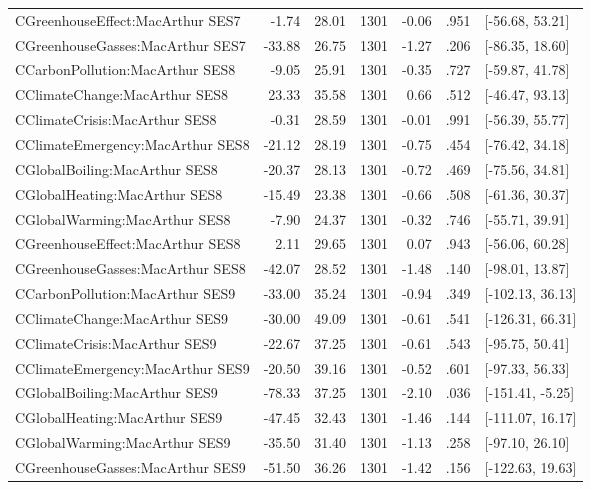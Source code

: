 \begin{table}[ht]
\begin{tabular}{lrrrrrl}
  CGreenhouseEffect:MacArthur SES7 & -1.74 & 28.01 & 1301 & -0.06 & .951 & [-56.68, 53.21] \\ 
  CGreenhouseGasses:MacArthur SES7 & -33.88 & 26.75 & 1301 & -1.27 & .206 & [-86.35, 18.60] \\ 
  CCarbonPollution:MacArthur SES8 & -9.05 & 25.91 & 1301 & -0.35 & .727 & [-59.87, 41.78] \\ 
  CClimateChange:MacArthur SES8 & 23.33 & 35.58 & 1301 & 0.66 & .512 & [-46.47, 93.13] \\ 
  CClimateCrisis:MacArthur SES8 & -0.31 & 28.59 & 1301 & -0.01 & .991 & [-56.39, 55.77] \\ 
  CClimateEmergency:MacArthur SES8 & -21.12 & 28.19 & 1301 & -0.75 & .454 & [-76.42, 34.18] \\ 
  CGlobalBoiling:MacArthur SES8 & -20.37 & 28.13 & 1301 & -0.72 & .469 & [-75.56, 34.81] \\ 
  CGlobalHeating:MacArthur SES8 & -15.49 & 23.38 & 1301 & -0.66 & .508 & [-61.36, 30.37] \\ 
  CGlobalWarming:MacArthur SES8 & -7.90 & 24.37 & 1301 & -0.32 & .746 & [-55.71, 39.91] \\ 
  CGreenhouseEffect:MacArthur SES8 & 2.11 & 29.65 & 1301 & 0.07 & .943 & [-56.06, 60.28] \\ 
  CGreenhouseGasses:MacArthur SES8 & -42.07 & 28.52 & 1301 & -1.48 & .140 & [-98.01, 13.87] \\ 
  CCarbonPollution:MacArthur SES9 & -33.00 & 35.24 & 1301 & -0.94 & .349 & [-102.13, 36.13] \\ 
  CClimateChange:MacArthur SES9 & -30.00 & 49.09 & 1301 & -0.61 & .541 & [-126.31, 66.31] \\ 
  CClimateCrisis:MacArthur SES9 & -22.67 & 37.25 & 1301 & -0.61 & .543 & [-95.75, 50.41] \\ 
  CClimateEmergency:MacArthur SES9 & -20.50 & 39.16 & 1301 & -0.52 & .601 & [-97.33, 56.33] \\ 
  CGlobalBoiling:MacArthur SES9 & -78.33 & 37.25 & 1301 & -2.10 & .036 & [-151.41, -5.25] \\ 
  CGlobalHeating:MacArthur SES9 & -47.45 & 32.43 & 1301 & -1.46 & .144 & [-111.07, 16.17] \\ 
  CGlobalWarming:MacArthur SES9 & -35.50 & 31.40 & 1301 & -1.13 & .258 & [-97.10, 26.10] \\ 
  CGreenhouseGasses:MacArthur SES9 & -51.50 & 36.26 & 1301 & -1.42 & .156 & [-122.63, 19.63] \\ 
   \hline
\end{tabular}
\end{table}
